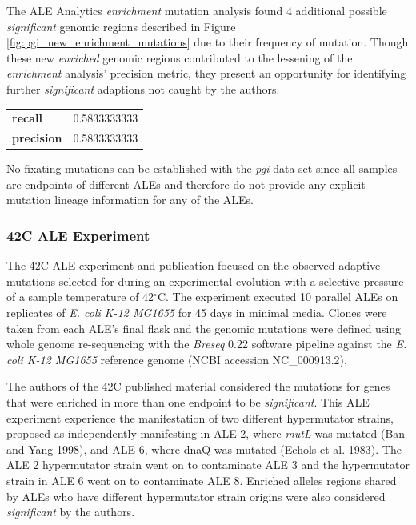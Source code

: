 \documentclass[12pt,final,masters,chapterheads]{ucsd}  %
\begin{document}
The ALE Analytics \textit{enrichment} mutation analysis found 4 additional possible \textit{significant} genomic regions described in Figure \ref{fig:pgi_new_enrichment_mutations} due to their frequency of mutation. Though these new \textit{enriched} genomic regions contributed to the lessening of the \textit{enrichment} analysis' precision metric, they present an opportunity for identifying further \textit{significant} adaptions not caught by the authors.
\begin{table}[h!]
\centering
\begin{tabular}{ l r }
  \textbf{recall} & 0.5833333333 \\
  \textbf{precision} & 0.5833333333 \\
\end{tabular}
\end{table}
No fixating mutations can be established with the \textit{pgi} data set since all samples are endpoints of different ALEs and therefore do not provide any explicit mutation lineage information for any of the ALEs.

\subsubsection{42C ALE Experiment}

The 42C ALE experiment and publication focused on the observed adaptive mutations selected for during an experimental evolution with a selective pressure of a sample temperature of 42$^{\circ}$C. The experiment executed 10 parallel ALEs on replicates of \textit{E. coli K-12 MG1655} for 45 days in minimal media. Clones were taken from each ALE's final flask and the genomic mutations were defined using whole genome re-sequencing with the \textit{Breseq} 0.22 software pipeline against the \textit{E. coli K-12 MG1655} reference genome (NCBI accession NC\_000913.2).

The authors of the 42C published material considered the mutations for genes that were enriched in more than one endpoint to be \textit{significant}. This ALE experiment experience the manifestation of two different hypermutator strains, proposed as independently manifesting in ALE 2, where \textit{mutL} was mutated (Ban and Yang 1998), and ALE 6, where dnaQ was mutated (Echols et al. 1983). The ALE 2 hypermutator strain went on to contaminate ALE 3 and the hypermutator strain in ALE 6 went on to contaminate ALE 8. Enriched alleles regions shared by ALEs who have different hypermutator strain origins were also considered \textit{significant} by the authors.
\end{document}
